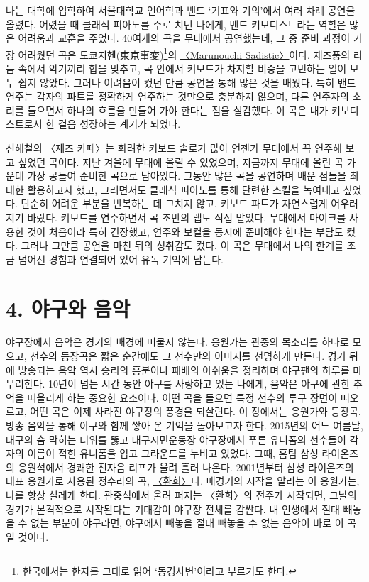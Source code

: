 \documentclass{article}
\let\plainhref\href
\renewcommand{\href}[2]{\plainhref{#1}{\underline{#2}}}
\begin{document}
 \indent 나는 대학에 입학하여 서울대학교 언어학과 밴드 `기표와 기의'에서 여러 차례 공연을 올렸다. 어렸을 때 클래식 피아노를 주로 치던 나에게, 밴드 키보디스트라는 역할은 많은 어려움과 교훈을 주었다. 40여개의 곡을 무대에서 공연했는데, 그 중 준비 과정이 가장 어려웠던 곡은 도쿄지헨(東京事変)\footnote{한국에서는 한자를 그대로 읽어 `동경사변'이라고 부르기도 한다.}의 \href{https://youtu.be/4tlUwgtgdZA?si=3tPUqlSChq6u4uQb}{〈Marunouchi Sadistic〉}이다. 재즈풍의 리듬 속에서 악기끼리 합을 맞추고, 곡 안에서 키보드가 차지할 비중을 고민하는 일이 모두 쉽지 않았다. 그러나 어려움이 컸던 만큼 공연을 통해 많은 것을 배웠다. 특히 밴드 연주는 각자의 파트를 정확하게 연주하는 것만으로 충분하지 않으며, 다른 연주자의 소리를 들으면서 하나의 흐름을 만들어 가야 한다는 점을 실감했다. 이 곡은 내가 키보디스트로서 한 걸음 성장하는 계기가 되었다.
\medskip

 \indent 신해철의 \href{https://youtu.be/qRtgglIu5KY?si=a3lN-o80CFhK-phu}{〈재즈 카페〉}는 화려한 키보드 솔로가 많아 언젠가 무대에서 꼭 연주해 보고 싶었던 곡이다. 지난 겨울에 무대에 올릴 수 있었으며, 지금까지 무대에 올린 곡 가운데 가장 공들여 준비한 곡으로 남아있다. 그동안 많은 곡을 공연하며 배운 점들을 최대한 활용하고자 했고, 그러면서도 클래식 피아노를 통해 단련한 스킬을 녹여내고 싶었다. 단순히 어려운 부분을 반복하는 데 그치지 않고, 키보드 파트가 자연스럽게 어우러지기 바랐다. 키보드를 연주하면서 곡 초반의 랩도 직접 맡았다. 무대에서 마이크를 사용한 것이 처음이라 특히 긴장했고, 연주와 보컬을 동시에 준비해야 한다는 부담도 컸다. 그러나 그만큼 공연을 마친 뒤의 성취감도 컸다. 이 곡은 무대에서 나의 한계를 조금 넘어선 경험과 연결되어 있어 유독 기억에 남는다.

\section{4. 야구와 음악}
\label{sec.4}

\indent 야구장에서 음악은 경기의 배경에 머물지 않는다. 응원가는 관중의 목소리를 하나로 모으고, 선수의 등장곡은 짧은 순간에도 그 선수만의 이미지를 선명하게 만든다. 경기 뒤에 방송되는 음악 역시 승리의 흥분이나 패배의 아쉬움을 정리하며 야구팬의 하루를 마무리한다. 10년이 넘는 시간 동안 야구를 사랑하고 있는 나에게, 음악은 야구에 관한 추억을 떠올리게 하는 중요한 요소이다. 어떤 곡을 들으면 특정 선수의 투구 장면이 떠오르고, 어떤 곡은 이제 사라진 야구장의 풍경을 되살린다. 이 장에서는 응원가와 등장곡, 방송 음악을 통해 야구와 함께 쌓아 온 기억을 돌아보고자 한다. 2015년의 어느 여름날, 대구의 숨 막히는 더위를 뚫고 대구시민운동장 야구장에서 푸른 유니폼의 선수들이 각자의 이름이 적힌 유니폼을 입고 그라운드를 누비고 있었다. 그때, 홈팀 삼성 라이온즈의 응원석에서 경쾌한 전자음 리프가 울려 흘러 나온다. 2001년부터 삼성 라이온즈의 대표 응원가로 사용된 정수라의 곡, \href{https://youtu.be/gJ7h7DPhz_E?si=h7m65UhjbibwVouM}{〈환희〉}다. 매경기의 시작을 알리는 이 응원가는, 나를 항상 설레게 한다. 관중석에서 울려 퍼지는 〈환희〉의 전주가 시작되면, 그날의 경기가 본격적으로 시작된다는 기대감이 야구장 전체를 감싼다. 내 인생에서 절대 빼놓을 수 없는 부분이 야구라면, 야구에서 빼놓을 절대 빼놓을 수 없는 음악이 바로 이 곡일 것이다.  
\medskip
\end{document}
